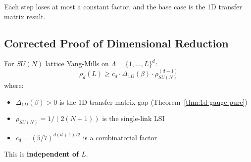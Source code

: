 Each step loses at most a constant factor, and the base case is the 1D transfer 
matrix result.

\subsection{Corrected Proof of Dimensional Reduction}

\begin{theorem}
\label{thm:dim-reduction-corrected}
For $SU(N)$ lattice Yang-Mills on $\Lambda = \{1, \ldots, L\}^d$:
\[
\rho_d(L) \geq c_d \cdot \Delta_{1D}(\beta) \cdot \rho_{SU(N)}^{(d-1)}
\]
where:
\begin{itemize}
\item $\Delta_{1D}(\beta) > 0$ is the 1D transfer matrix gap (Theorem~\ref{thm:1d-gauge-pure})
\item $\rho_{SU(N)} = 1/(2(N+1))$ is the single-link LSI
\item $c_d = (5/7)^{d(d+1)/2}$ is a combinatorial factor
\end{itemize}

This is \textbf{independent of $L$}.
\end{theorem}

